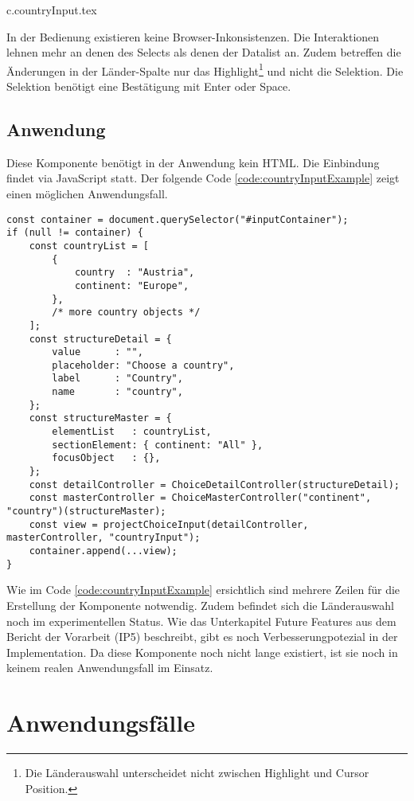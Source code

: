 {c.countryInput.tex}

In der Bedienung existieren keine Browser-Inkonsistenzen. 
Die Interaktionen lehnen mehr an denen des Selects als denen der Datalist an. 
Zudem betreffen die Änderungen in der Länder-Spalte nur das Highlight\footnote{
    Die Länderauswahl unterscheidet nicht zwischen Highlight und Cursor Position. 
} und nicht die Selektion. 
Die Selektion benötigt eine Bestätigung mit Enter oder Space. 


\subsection{Anwendung}
\label{sec:countryChoiceUse}

Diese Komponente benötigt in der Anwendung kein HTML. 
Die Einbindung findet via JavaScript statt. 
Der folgende Code \ref{code:countryInputExample} zeigt einen möglichen Anwendungsfall. 

\begin{lstlisting}[style = htmlcssjs, caption = Länderauswahl Beispiel, label = code:countryInputExample]
const container = document.querySelector("#inputContainer");
if (null != container) {
    const countryList = [
        {
            country  : "Austria",
            continent: "Europe",
        },
        /* more country objects */
    ];
    const structureDetail = {
        value      : "",
        placeholder: "Choose a country",
        label      : "Country",
        name       : "country",
    };
    const structureMaster = {
        elementList   : countryList,
        sectionElement: { continent: "All" },
        focusObject   : {},
    };
    const detailController = ChoiceDetailController(structureDetail);
    const masterController = ChoiceMasterController("continent", "country")(structureMaster);
    const view = projectChoiceInput(detailController, masterController, "countryInput");
    container.append(...view);
}
\end{lstlisting}

Wie im Code \ref{code:countryInputExample} ersichtlich sind mehrere Zeilen für die Erstellung der Komponente notwendig. 
Zudem befindet sich die Länderauswahl noch im experimentellen Status. 
Wie das Unterkapitel Future Features aus dem Bericht\citemarktext{
    [\cite{ip5}]
} der Vorarbeit (IP5) beschreibt, gibt es noch Verbesserungpotezial in der Implementation. 
Da diese Komponente noch nicht lange existiert, ist sie noch in keinem realen Anwendungsfall im Einsatz. 


\section{Anwendungsfälle}
\label{sec:useCases}

